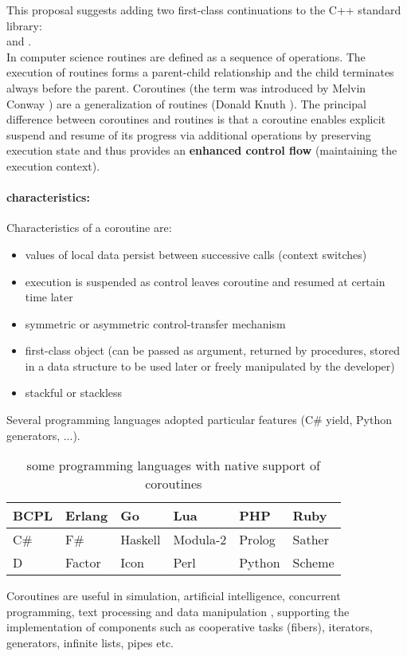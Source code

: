 
This proposal suggests adding two first-class continuations to the C++ standard
library:\\
\pullcoro and \pushcoro.\\
\newline
In computer science routines are defined as a sequence of operations. The
execution of routines forms a parent-child relationship and the child terminates
always before the parent. Coroutines (the term was introduced by Melvin
Conway \cite{Conway1963}) are a generalization of routines (Donald
Knuth \cite{Knuth1997}). The principal difference between coroutines and routines
is that a coroutine enables explicit suspend and resume of its progress via
additional operations by preserving execution state and thus provides an
{\bf enhanced control flow} (maintaining the execution context).\\

\paragraph*{characteristics:}
Characteristics \cite{Moura2009} of a coroutine are:
\begin{itemize}
    \item values of local data persist between successive calls (context
          switches)
    \item execution is suspended as control leaves coroutine and resumed at
          certain time later
    \item symmetric or asymmetric control-transfer mechanism
    \item first-class object (can be passed as argument, returned by procedures,
          stored in a data structure to be used later or freely manipulated by
          the developer)
    \item stackful or stackless
\end{itemize}

Several programming languages adopted particular features (C\# yield, Python
generators, ...).
\begin{table}[h]
    \centering
    \begin{tabular}{ l l l l l l }
        \midrule
        BCPL    &   Erlang  &   Go      &   Lua         &   PHP     &   Ruby\\
        \midrule
        C\#     &   F\#     &   Haskell &   Modula-2    &   Prolog  &   Sather\\
        \midrule
        D       &   Factor  &   Icon    &   Perl        &   Python  &   Scheme\\
        \midrule
    \end{tabular}
    \caption{some programming languages with native support of coroutines
        \cite{wikipedia}}
\end{table}
\newline
Coroutines are useful in simulation, artificial intelligence, concurrent
programming, text processing and data manipulation \cite{Moura2009}, supporting
the implementation of components such as cooperative tasks (fibers), iterators,
generators, infinite lists, pipes etc.

